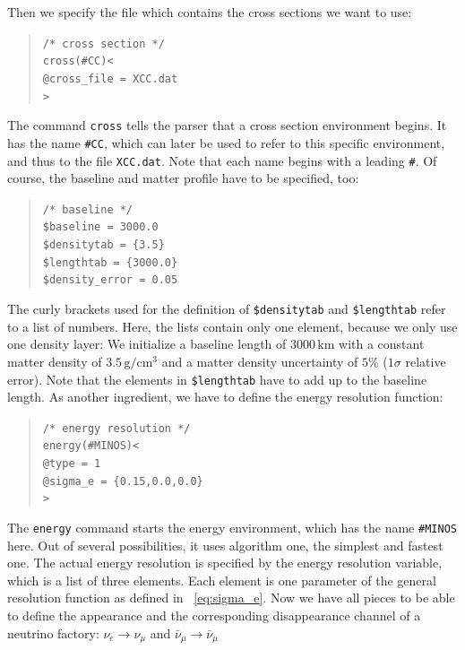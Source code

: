 Then we specify the file which contains the cross sections we want to 
use:
\begin{quote}
{\tt /* cross section */}\\
{\tt cross(\#CC)<}\\
{\tt \tb @cross\_file = XCC.dat}\\
{\tt >}
\end{quote}
The command {\tt cross} tells the parser that a cross section environment
begins. It has the name {\tt \#CC}, which can later be used to refer 
to this specific environment, and thus to the file {\tt XCC.dat}. Note that each name begins with a leading {\tt \#}.
%
Of course, the baseline and matter profile have to be specified, too:
\begin{quote}
{\tt /* baseline */}\\
{\tt \$baseline = 3000.0}\\
{\tt \$densitytab = \{3.5\}}\\
{\tt \$lengthtab = \{3000.0\}}\\
{\tt \$density\_error = 0.05}
\end{quote}
The curly brackets used for the definition of {\tt \$densitytab} and
{\tt \$lengthtab} refer to a list of numbers. Here, the lists contain only
one element, because we only use one density layer: We initialize a baseline length of $3000 \, \mathrm{km}$ with a constant matter density of $3.5 \, \mathrm{g/cm^3}$ and a matter density uncertainty of $5\%$ ($1 \sigma$ relative error). Note that the elements in {\tt \$lengthtab} have to add up to the baseline length. 
%
As another ingredient, we have to define the energy resolution function:
\begin{quote}
{\tt /* energy resolution */}\\
{\tt energy(\#MINOS)<}\\
{\tt \tb @type = 1}\\
{\tt \tb @sigma\_e = \{0.15,0.0,0.0\}}\\
{\tt >}
\end{quote}
The {\tt energy} command starts the energy environment, which has the name 
{\tt \#MINOS} here. Out of several possibilities, it uses algorithm one,
the simplest and fastest one. The actual energy resolution is specified
by the energy resolution variable, which is a list of three elements. Each 
element is one parameter of the general resolution function as defined in 
\eq~\ref{eq:sigma_e}.
%
Now we have all pieces to be able to define the appearance and the corresponding disappearance channel of a neutrino factory: 
$\nu_e\rightarrow\nu_\mu$  and $\bar\nu_\mu\rightarrow\bar\nu_\mu$ 
